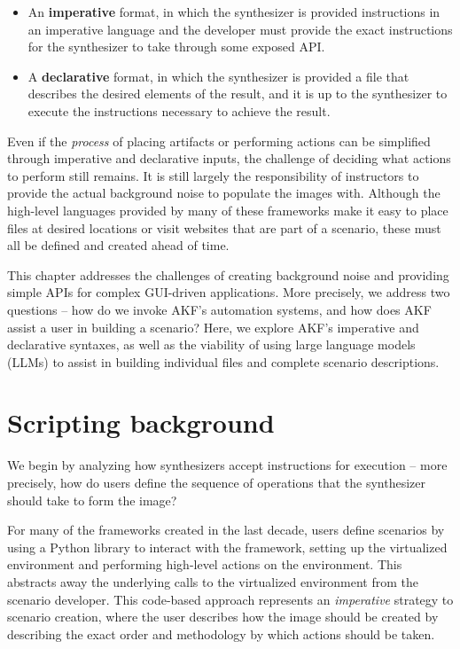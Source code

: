 \documentclass[letterpaper,12pt]{report}
\def\tightlist{}
\begin{document}
\begin{itemize}
\tightlist
\item
  An \textbf{imperative} format, in which the synthesizer is provided
  instructions in an imperative language and the developer must provide
  the exact instructions for the synthesizer to take through some
  exposed API.
\item
  A \textbf{declarative} format, in which the synthesizer is provided a
  file that describes the desired elements of the result, and it is up
  to the synthesizer to execute the instructions necessary to achieve
  the result.
\end{itemize}

Even if the \emph{process} of placing artifacts or performing actions
can be simplified through imperative and declarative inputs, the
challenge of deciding what actions to perform still remains. It is still
largely the responsibility of instructors to provide the actual
background noise to populate the images with. Although the high-level
languages provided by many of these frameworks make it easy to place
files at desired locations or visit websites that are part of a
scenario, these must all be defined and created ahead of time.

This chapter addresses the challenges of creating background noise and
providing simple APIs for complex GUI-driven applications. More
precisely, we address two questions -- how do we invoke AKF's automation
systems, and how does AKF assist a user in building a scenario? Here, we
explore AKF's imperative and declarative syntaxes, as well as the
viability of using large language models (LLMs) to assist in building
individual files and complete scenario descriptions.

\section{Scripting background}\label{scripting-background}

We begin by analyzing how synthesizers accept instructions for execution
-- more precisely, how do users define the sequence of operations that
the synthesizer should take to form the image?

For many of the frameworks created in the last decade, users define
scenarios by using a Python library to interact with the framework,
setting up the virtualized environment and performing high-level actions
on the environment. This abstracts away the underlying calls to the
virtualized environment from the scenario developer. This code-based
approach represents an \emph{imperative} strategy to scenario creation,
where the user describes how the image should be created by describing
the exact order and methodology by which actions should be taken.
\end{document}
